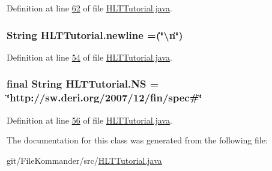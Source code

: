 Definition at line \hyperlink{L62}{62} of file \hyperlink{}{H\-L\-T\-Tutorial.\-java}.

\hypertarget{class_h_l_t_tutorial_adb4199589eaaf5b9598cc2b2f7590659}{
\subsubsection[{newline}]{\setlength{\rightskip}{0pt plus 5cm}String H\-L\-T\-Tutorial.\-newline =(\char`\"{}\textbackslash{}n\char`\"{})\hspace{0.3cm}{\ttfamily [static]}}}\label{class_h_l_t_tutorial_adb4199589eaaf5b9598cc2b2f7590659}


Definition at line \hyperlink{L54}{54} of file \hyperlink{}{H\-L\-T\-Tutorial.\-java}.

\hypertarget{class_h_l_t_tutorial_a26ee4eae95ef93834a86936c107361b0}{
\subsubsection[{N\-S}]{\setlength{\rightskip}{0pt plus 5cm}final String H\-L\-T\-Tutorial.\-N\-S = \char`\"{}http\-://sw.\-deri.\-org/2007/12/fin/spec\#\char`\"{}\hspace{0.3cm}{\ttfamily [static]}}}\label{class_h_l_t_tutorial_a26ee4eae95ef93834a86936c107361b0}


Definition at line \hyperlink{L56}{56} of file \hyperlink{}{H\-L\-T\-Tutorial.\-java}.



The documentation for this class was generated from the following file\-:\begin{DoxyCompactItemize}
\item 
git/\-File\-Kommander/src/\hyperlink{_h_l_t_tutorial_8java}{H\-L\-T\-Tutorial.\-java}\end{DoxyCompactItemize}
